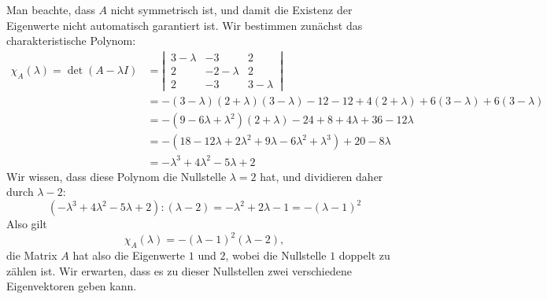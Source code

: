 \begin{loesung}
Man beachte, dass $A$ nicht symmetrisch ist, und damit die Existenz der
Eigenwerte nicht automatisch garantiert ist.
Wir bestimmen zunächst das charakteristische Polynom:
\begin{align*}
\chi_A(\lambda)=
\det (A-\lambda I)
&=
\left|\,
\begin{matrix}
3-\lambda&-3&2\\
2&-2-\lambda&2\\
2&-3&3-\lambda
\end{matrix}
\,\right|
\\
&=-(3-\lambda)(2+\lambda)(3-\lambda) -12-12
+4(2+\lambda)+6(3-\lambda)+6(3-\lambda)
\\
&=
-(9-6\lambda+\lambda^2)(2+\lambda)-24 +8+4\lambda +36-12\lambda
\\
&=
-(18-12\lambda+2\lambda^2+9\lambda -6\lambda^2+\lambda^3)+20-8\lambda
\\
&=
-\lambda^3+4\lambda^2-5\lambda+2
\end{align*}
Wir wissen, dass diese Polynom die Nullstelle $\lambda=2$ hat, und
dividieren daher durch $\lambda -2$:
\[
(-\lambda^3+4\lambda^2-5\lambda+2):(\lambda -2)=-\lambda^2+2\lambda-1
=-(\lambda -1)^2
\]
Also gilt
\[
\chi_A(\lambda)=-(\lambda -1)^2(\lambda -2),
\]
die Matrix $A$ hat also die Eigenwerte $1$ und $2$, wobei die Nullstelle
$1$ doppelt zu zählen ist. Wir erwarten, dass es zu dieser Nullstellen
zwei verschiedene Eigenvektoren geben kann.


\end{loesung}
